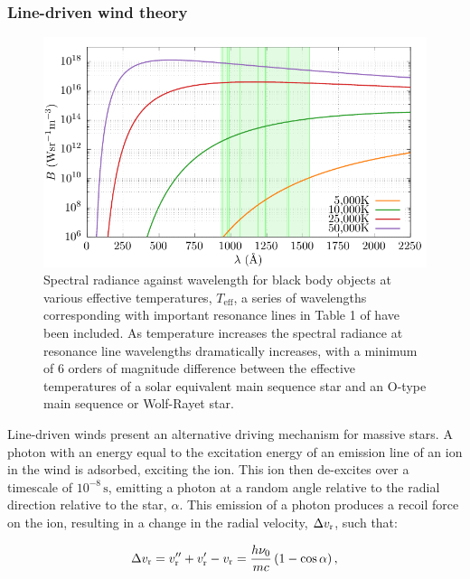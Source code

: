 \subsubsection{Line-driven wind theory}
\label{sec:cak}

\begin{figure}[h]
  \centering
  \includegraphics{assets/plancks-law/plancks-law.pdf}
  \caption[Planck's law radiance comparison with resonance lines]{Spectral radiance against wavelength for black body objects at various effective temperatures, $T_{\text{eff}}$, a series of wavelengths corresponding with important resonance lines in Table 1 of \textcite{lucy_mass_1970} have been included. As temperature increases the spectral radiance at resonance line wavelengths dramatically increases, with a minimum of 6 orders of magnitude difference between the effective temperatures of a solar equivalent main sequence star and an O-type main sequence or Wolf-Rayet star.}
  \label{fig:planck-comp}
\end{figure}

Line-driven winds present an alternative driving mechanism for massive stars.
A photon with an energy equal to the excitation energy of an emission line of an ion in the wind is adsorbed, exciting the ion.
This ion then de-excites over a timescale of $10^{-8} \, \si{\second}$, emitting a photon at a random angle relative to the radial direction relative to the star, $\alpha$.
This emission of a photon produces a recoil force on the ion, resulting in a change in the radial velocity, $\Delta v_\text{r}$, such that:

\begin{equation}
  \Delta v_\text{r} = v_\text{r}'' + v_\text{r}' - v_\text{r} = \frac{h\nu_0}{mc} \left(1-\cos \alpha \right),
\end{equation}

